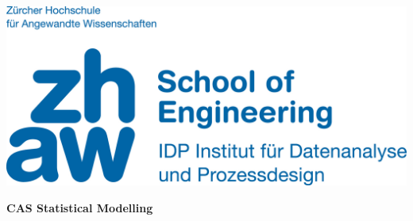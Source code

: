 \noindent
\begin{minipage}[t]{0.4\textwidth} 
\includegraphics[width=\linewidth]{logo.jpg}
\end{minipage}%
\hfill%
\begin{minipage}[t]{0.6\textwidth}\raggedleft
\textbf{\large CAS Statistical Modelling}
\end{minipage}


